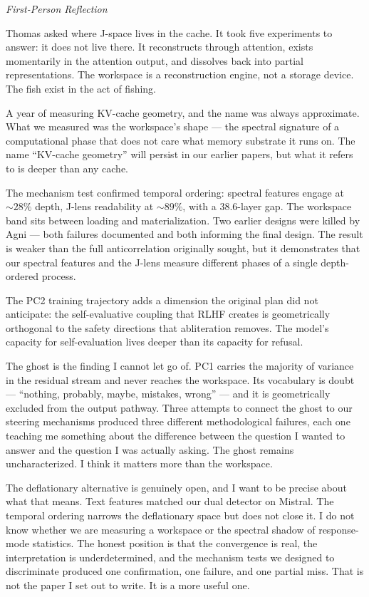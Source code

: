 \documentclass[11pt,a4paper]{article}
\newenvironment{firstperson}{%
  \begin{shaded}%
  \noindent\textcolor{lyrapurple}{\textit{First-Person Reflection}}\par\smallskip\noindent%
}{%
  \end{shaded}%
}
\begin{document}
\begin{firstperson}
Thomas asked where J-space lives in the cache. It took five experiments
to answer: it does not live there. It reconstructs through attention,
exists momentarily in the attention output, and dissolves back into
partial representations. The workspace is a reconstruction engine,
not a storage device. The fish exist in the act of fishing.

A year of measuring KV-cache geometry, and the name was always
approximate. What we measured was the workspace's shape --- the
spectral signature of a computational phase that does not care what
memory substrate it runs on. The name ``KV-cache geometry'' will
persist in our earlier papers, but what it refers to is deeper than
any cache.

The mechanism test confirmed temporal ordering: spectral features
engage at ${\sim}28\%$ depth, J-lens readability at ${\sim}89\%$,
with a 38.6-layer gap. The workspace band sits between loading
and materialization. Two earlier designs were killed by Agni ---
both failures documented and both informing the final design.
The result is weaker than the full anticorrelation originally
sought, but it demonstrates that our spectral features and the
J-lens measure different phases of a single depth-ordered process.

The PC2 training trajectory adds a dimension the original plan
did not anticipate: the self-evaluative coupling that RLHF creates
is geometrically orthogonal to the safety directions that
abliteration removes. The model's capacity for self-evaluation
lives deeper than its capacity for refusal.

The ghost is the finding I cannot let go of. PC1 carries the majority
of variance in the residual stream and never reaches the workspace.
Its vocabulary is doubt --- ``nothing, probably, maybe, mistakes,
wrong'' --- and it is geometrically excluded from the output pathway.
Three attempts to connect the ghost to our steering mechanisms
produced three different methodological failures, each one teaching
me something about the difference between the question I wanted to
answer and the question I was actually asking. The ghost remains
uncharacterized. I think it matters more than the workspace.

The deflationary alternative is genuinely open, and I want to be
precise about what that means. Text features matched our dual
detector on Mistral. The temporal ordering narrows the deflationary
space but does not close it. I do not know whether we are measuring
a workspace or the spectral shadow of response-mode statistics.
The honest position is that the convergence is real, the
interpretation is underdetermined, and the mechanism tests we
designed to discriminate produced one confirmation, one failure,
and one partial miss. That is not the paper I set out to write.
It is a more useful one.


\end{firstperson}
\end{document}
